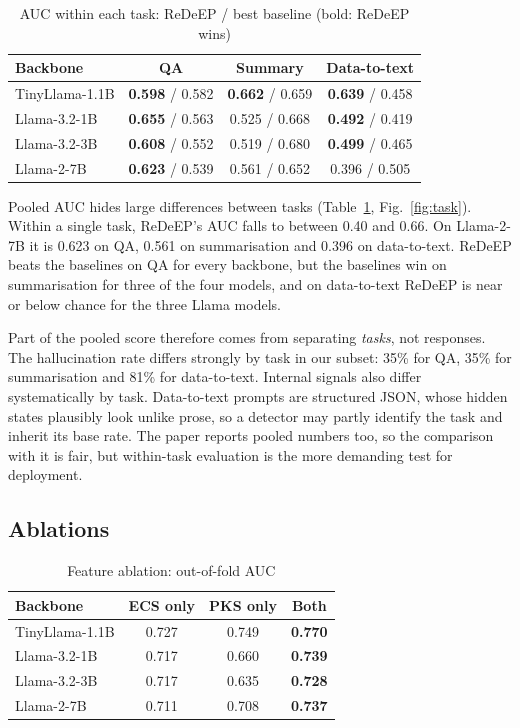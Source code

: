 \documentclass[conference]{IEEEtran}
\begin{document}
\begin{table}[t]
\caption{AUC within each task: ReDeEP / best baseline (bold: ReDeEP wins)}
\label{tab:task}
\centering\footnotesize
\setlength{\tabcolsep}{3pt}
\begin{tabular}{@{}lccc@{}}
\toprule
Backbone & QA & Summary & Data-to-text \\
\midrule
TinyLlama-1.1B & \textbf{0.598} / 0.582 & \textbf{0.662} / 0.659 & \textbf{0.639} / 0.458 \\
Llama-3.2-1B & \textbf{0.655} / 0.563 & 0.525 / 0.668 & \textbf{0.492} / 0.419 \\
Llama-3.2-3B & \textbf{0.608} / 0.552 & 0.519 / 0.680 & \textbf{0.499} / 0.465 \\
Llama-2-7B & \textbf{0.623} / 0.539 & 0.561 / 0.652 & 0.396 / 0.505 \\
\bottomrule
\end{tabular}
\end{table}

Pooled AUC hides large differences between tasks (Table~\ref{tab:task}, Fig.~\ref{fig:task}). Within a single task, ReDeEP's AUC falls to between 0.40 and 0.66. On Llama-2-7B it is 0.623 on QA, 0.561 on summarisation and 0.396 on data-to-text. ReDeEP beats the baselines on QA for every backbone, but the baselines win on summarisation for three of the four models, and on data-to-text ReDeEP is near or below chance for the three Llama models.

Part of the pooled score therefore comes from separating \emph{tasks}, not responses. The hallucination rate differs strongly by task in our subset: 35\% for QA, 35\% for summarisation and 81\% for data-to-text. Internal signals also differ systematically by task. Data-to-text prompts are structured JSON, whose hidden states plausibly look unlike prose, so a detector may partly identify the task and inherit its base rate. The paper reports pooled numbers too, so the comparison with it is fair, but within-task evaluation is the more demanding test for deployment.

\subsection{Ablations}
\begin{table}[t]
\caption{Feature ablation: out-of-fold AUC}
\label{tab:abl}
\centering\footnotesize
\begin{tabular}{@{}lccc@{}}
\toprule
Backbone & ECS only & PKS only & Both \\
\midrule
TinyLlama-1.1B & 0.727 & 0.749 & \textbf{0.770} \\
Llama-3.2-1B & 0.717 & 0.660 & \textbf{0.739} \\
Llama-3.2-3B & 0.717 & 0.635 & \textbf{0.728} \\
Llama-2-7B & 0.711 & 0.708 & \textbf{0.737} \\
\bottomrule
\end{tabular}
\end{table}
\end{document}
